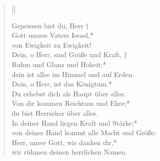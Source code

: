 \vspace{0.6cm}

\def\greinitialformat#1{{\fontsize{40}{40}\selectfont #1}}
\gresetfirstlineaboveinitial{\small \textcolor{red}{1 Chr 29}}{}
\setaboveinitialseparation{0.72mm}



\begin{verse}[\versewidth]

Gepriesen bist du, Herr †\\
Gott unsres Vaters Israel,*\\
von Ewigkeit zu Ewigkeit!\\
\vin Dein, o Herr, sind Größe und Kraft, †\\
\vin Ruhm und Glanz und Hoheit;*\\
dein ist alles im Himmel und auf Erden.\\
\vin Dein, o Herr, ist das Königtum.*\\
\vin Du erhebst dich als Haupt über alles.\\
Von dir kommen Reichtum und Ehre;*\\
du bist Herrscher über alles.\\
\vin In deiner Hand liegen Kraft und Stärke;*\\
\vin von deiner Hand kommt alle Macht und Größe:\\
Herr, unser Gott, wir danken dir,*\\
wir rühmen deinen herrlichen Namen.\\
 
\end{verse}




\def\greinitialformat#1{{\fontsize{40}{40}\selectfont #1}}
\gresetfirstlineaboveinitial{\small \textcolor{red}{Eccl 36}}{}
\setaboveinitialseparation{0.72mm}



